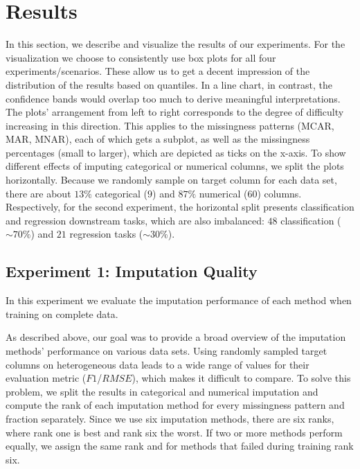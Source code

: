 \section{Results}
\label{sec:results}

In this section, we describe and visualize the results of our experiments. For the visualization we choose to consistently use box plots for all four experiments/scenarios. These allow us to get a decent impression of the distribution of the results based on quantiles. In a line chart, in contrast, the confidence bands would overlap too much to derive meaningful interpretations. The plots' arrangement from left to right corresponds to the degree of difficulty increasing in this direction. This applies to the missingness patterns (MCAR, MAR, MNAR), each of which gets a subplot, as well as the missingness percentages (small to larger), which are depicted as ticks on the x-axis. To show different effects of imputing categorical or numerical columns, we split the plots horizontally. Because we randomly sample on target column for each data set, there are about $13\%$ categorical ($9$) and $87\%$ numerical ($60$) columns. Respectively, for the second experiment, the horizontal split presents classification and regression downstream tasks, which are also imbalanced: $48$ classification ($\sim70\%$) and $21$ regression tasks ($\sim30\%$).



\subsection{Experiment 1: Imputation Quality}

In this experiment we evaluate the imputation performance of each method when training on complete data.

As described above, our goal was to provide a broad overview of the imputation methods' performance on various data sets. Using randomly sampled target columns on heterogeneous data leads to a wide range of values for their evaluation metric ($F1$/$RMSE$), which makes it difficult to compare. To solve this problem, we split the results in categorical and numerical imputation and compute the rank of each imputation method for every missingness pattern and fraction separately. Since we use six imputation methods, there are six ranks, where rank one is best and rank six the worst. If two or more methods perform equally, we assign the same rank and for methods that failed during training rank six.


